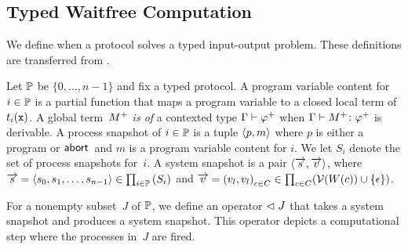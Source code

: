 {\subsection{Typed Waitfree Computation}

We define when a protocol solves a typed
input-output problem.
These definitions are transferred from \citet{Saks:1993vq}.


Let $\mathbb{P}$ be $\{0,\ldots, n-1\}$ and fix a typed protocol.
A program variable content for $i\in\mathbb{P}$ is a
partial function that maps a program variable to a closed local term of
$t_i(\texttt{x})$.
A global term~${M}^+$ \textit{is of} a contexted type $\Gamma\vdash{\varphi}^+$ when
$\Gamma\vdash{{M}^+} \colon{{\varphi}^+}$ is derivable.
A process snapshot of $i\in\mathbb{P}$ is a tuple
$\langle{p,m}\rangle$ where $p$ is either a program or $\mathsf{abort\,}$ and $m$ is a
program variable content for $i$.
We let $S_i$ denote the set of process snapshots for~$i$.
A system snapshot
is a pair $\langle{\overrightarrow s, \overrightarrow v}\rangle$, where $\overrightarrow s = \langle{s_0,
{s_1,{\ldots,s_{n-1}}}}\rangle \in
\prod_{i\in \mathbb{P}}\left(S_i\right)
$
and
$\overrightarrow v =
\left({v}_{l}, {v}_{l}\right)_{c\in C} \in \prod_{c\in C}(\mathcal{V}(W(c))\cup\{\epsilon\})
$.

For a nonempty subset~$J$ of $\mathbb{P}$, we define an operator $\vartriangleleft J$ that
takes a system snapshot and produces a system snapshot.
This operator depicts a computational step where the processes in~$J$
are fired.

}
